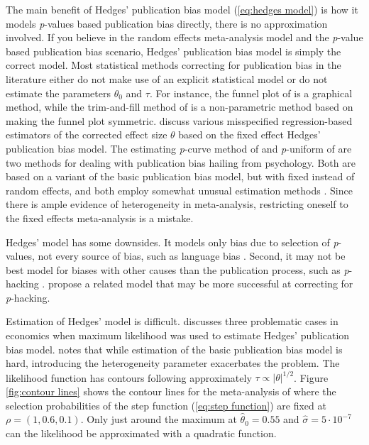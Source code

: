 \documentclass[article]{ajs}
\numberwithin{equation}{section}
\numberwithin{figure}{section}
\theoremstyle{plain}
\theoremstyle{definition}
\theoremstyle{definition}
\theoremstyle{plain}
\begin{document}
The main benefit of Hedges' publication bias model (\ref{eq:hedges model}) is how it models \textit{p}-values based publication bias directly, there is no approximation involved. If you believe in the random effects meta-analysis model and the \textit{p}-value based publication bias scenario, Hedges' publication bias model is simply the correct model. Most statistical methods correcting for publication bias in the literature either do not make use of an explicit statistical model or do not estimate the parameters $\theta_{0}$ and $\tau$. For instance, the funnel plot of \citet{Egger1997-rd} is a graphical method, while the trim-and-fill method of \citet{Duval2000-ct} is a non-parametric method based on making the funnel plot symmetric. \citet{Stanley2005-ng,stanley2014meta} discuss various misspecified regression-based estimators of the corrected effect size $\theta$ based on the fixed effect Hedges' publication bias model. The estimating \textit{p}-curve method of \citet{Simonsohn2014-cn} and \textit{p}-uniform of \citet{Van_Assen2015-qs,Van_Aert2016-cu} are two methods for dealing with publication bias hailing from psychology. Both are based on a variant of the basic publication bias model, but with fixed instead of random effects, and both employ somewhat unusual estimation methods \citep{McShane2016-rb}. Since there is ample evidence of heterogeneity in meta-analysis, restricting oneself to the fixed effects meta-analysis is a mistake.

Hedges' model has some downsides. It models only bias due to selection
of \textit{p}-values, not every source of bias, such as language bias
\citep{Egger1998-kj}. Second, it may not be best model for biases
with other causes than the publication process, such as \textit{p}-hacking
\citep{simmons2011false}. \citet{moss2019modelling} propose a related
model that may be more successful at correcting for \textit{p}-hacking. 

Estimation of Hedges' model is difficult. \citet[Section 6.3]{Stanley2005-ng}
discusses three problematic cases in economics when maximum likelihood
was used to estimate Hedges' publication bias model. \citet[Appendix A]{McShane2016-rb}
notes that while estimation of the basic publication bias model is
hard, introducing the heterogeneity parameter exacerbates the problem.
The likelihood function has contours following approximately $\tau\propto|\theta|^{1/2}$.
Figure \ref{fig:contour lines} shows the contour lines for the meta-analysis
of \citet{Cuddy2018-kp} where the selection probabilities of the
step function (\ref{eq:step function}) are fixed at $\rho=(1,0.6,0.1)$.
Only just around the maximum at $\hat{\theta}_{0}=0.55$ and $\hat{\sigma}=5\cdot10^{-7}$
can the likelihood be approximated with a quadratic function. 
\end{document}
